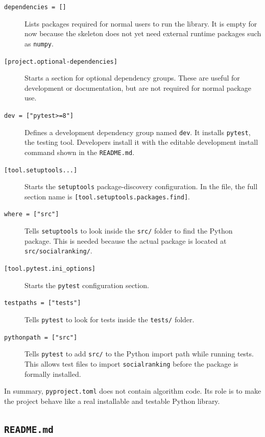 \documentclass[11pt]{article}
\begin{document}
\begin{description}
  \item[\texttt{dependencies = []}]
  Lists packages required for normal users to run the library. It is empty for
  now because the skeleton does not yet need external runtime packages such as
  \texttt{numpy}.

  \item[\texttt{[project.optional-dependencies]}]
  Starts a section for optional dependency groups. These are useful for
  development or documentation, but are not required for normal package use.

  \item[\texttt{dev = ["pytest>=8"]}]
  Defines a development dependency group named \texttt{dev}. It installs
  \texttt{pytest}, the testing tool. Developers install it with the editable
  development install command shown in the \texttt{README.md}.

  \item[\texttt{[tool.setuptools...]}]
  Starts the \texttt{setuptools} package-discovery configuration. In the file,
  the full section name is \texttt{[tool.setuptools.packages.find]}.

  \item[\texttt{where = ["src"]}]
  Tells \texttt{setuptools} to look inside the \texttt{src/} folder to find the
  Python package. This is needed because the actual package is located at
  \texttt{src/socialranking/}.

  \item[\texttt{[tool.pytest.ini\_options]}]
  Starts the \texttt{pytest} configuration section.

  \item[\texttt{testpaths = ["tests"]}]
  Tells \texttt{pytest} to look for tests inside the \texttt{tests/} folder.

  \item[\texttt{pythonpath = ["src"]}]
  Tells \texttt{pytest} to add \texttt{src/} to the Python import path while
  running tests. This allows test files to import \texttt{socialranking} before
  the package is formally installed.
\end{description}

\noindent In summary, \texttt{pyproject.toml} does not contain algorithm code.
Its role is to make the project behave like a real installable and testable
Python library.

\subsection{\texttt{README.md}}
\end{document}
